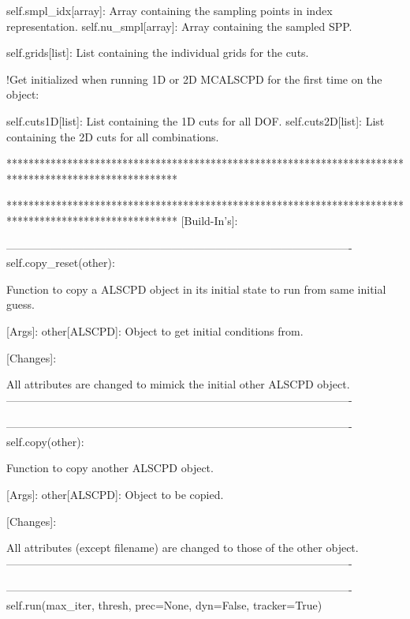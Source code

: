 \begin{DoxyVerb}
        self.smpl_idx[array]: Array containing the sampling points in index representation.
        self.nu_smpl[array]: Array containing the sampled SPP.
        
        self.grids[list]: List containing the individual grids for the cuts.
        
   !Get initialized when running 1D or 2D MCALSCPD for the first time on the object:
   
        self.cuts1D[list]: List containing the 1D cuts for all DOF.
        self.cuts2D[list]: List containing the 2D cuts for all combinations.
   
   *******************************************************************************************************
   
   *******************************************************************************************************
   [Build-In's]:
       
       ---------------------------------------------------------------------------------------------- 
       self.copy_reset(other):
       
           Function to copy a ALSCPD object in its initial state to run from same initial guess.
           
           [Args]:
                   other[ALSCPD]: Object to get initial conditions from.
                   
           [Changes]:
               
               All attributes are changed to mimick the initial other ALSCPD object.
       ----------------------------------------------------------------------------------------------                
           
       ----------------------------------------------------------------------------------------------            
       self.copy(other):
       
           Function to copy another ALSCPD object.
           
           [Args]:
                   other[ALSCPD]: Object to be copied.
                   
           [Changes]:
               
               All attributes (except filename) are changed to those of the other object.
       ----------------------------------------------------------------------------------------------           
       
       ----------------------------------------------------------------------------------------------             
       self.run(max_iter, thresh, prec=None, dyn=False, tracker=True)
           

\end{DoxyVerb}
